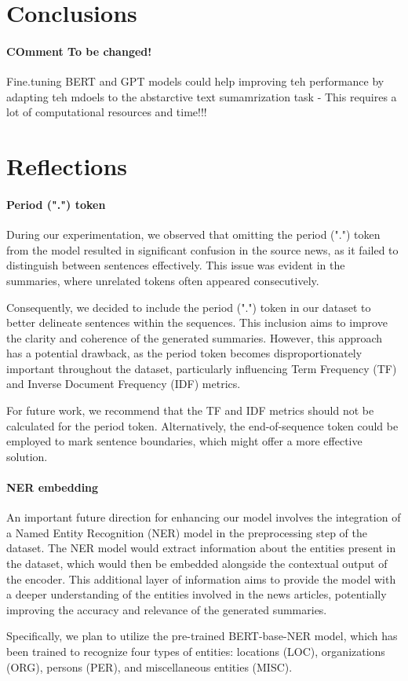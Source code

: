 \section{Conclusions}
\paragraph{COmment To be changed!}Fine.tuning BERT and GPT models could help improving teh performance by adapting teh mdoels to the abstarctive text sumamrization task - This requires a lot of computational resources and time!!!

\section{Reflections}
\paragraph{Period (".") token}
During our experimentation, we observed that omitting the period (".") token from the model resulted in significant confusion in the source news, as it failed to distinguish between sentences effectively. This issue was evident in the summaries, where unrelated tokens often appeared consecutively.

Consequently, we decided to include the period (".") token in our dataset to better delineate sentences within the sequences. This inclusion aims to improve the clarity and coherence of the generated summaries. However, this approach has a potential drawback, as the period token becomes disproportionately important throughout the dataset, particularly influencing Term Frequency (TF) and Inverse Document Frequency (IDF) metrics.

For future work, we recommend that the TF and IDF metrics should not be calculated for the period token. Alternatively, the end-of-sequence token could be employed to mark sentence boundaries, which might offer a more effective solution.

\paragraph{NER embedding}
An important future direction for enhancing our model involves the integration of a Named Entity Recognition (NER) model in the preprocessing step of the dataset. The NER model would extract information about the entities present in the dataset, which would then be embedded alongside the contextual output of the encoder. This additional layer of information aims to provide the model with a deeper understanding of the entities involved in the news articles, potentially improving the accuracy and relevance of the generated summaries. 

Specifically, we plan to utilize the pre-trained BERT-base-NER model\cite{BERTNER}, which has been trained to recognize four types of entities: locations (LOC), organizations (ORG), persons (PER), and miscellaneous entities (MISC). 

